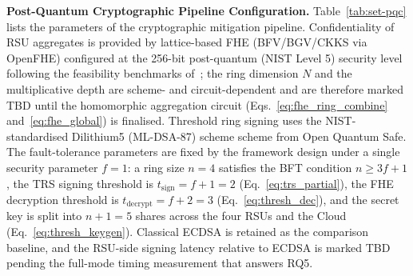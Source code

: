 \documentclass[12pt, a4paper]{report}
\begin{document}
\textbf{Post-Quantum Cryptographic Pipeline Configuration.}
Table~\ref{tab:set-pqc} lists the parameters of the cryptographic
mitigation pipeline. Confidentiality of RSU aggregates is provided by
lattice-based FHE (BFV/BGV/CKKS via OpenFHE) configured at the 256-bit post-quantum (NIST Level 5) security level following the feasibility benchmarks
of~\cite{mamun2025postquantum}; the ring dimension $N$ and the
multiplicative depth are scheme- and circuit-dependent and are therefore
marked TBD until the homomorphic aggregation circuit
(Eqs.~\eqref{eq:fhe_ring_combine} and~\eqref{eq:fhe_global}) is finalised.
Threshold ring signing uses the NIST-standardised Dilithium5 (ML-DSA-87) scheme
scheme from Open Quantum Safe. The fault-tolerance parameters are fixed by
the framework design under a single security parameter $f=1$: a ring size
$n=4$ satisfies the BFT condition $n \geq 3f+1$, the TRS signing threshold
is $t_{\mathrm{sign}}=f+1=2$ (Eq.~\eqref{eq:trs_partial}), the FHE
decryption threshold is $t_{\mathrm{decrypt}}=f+2=3$
(Eq.~\eqref{eq:thresh_dec}), and the secret key is split into $n+1=5$
shares across the four RSUs and the Cloud (Eq.~\eqref{eq:thresh_keygen}).
Classical ECDSA is retained as the comparison baseline, and the RSU-side
signing latency relative to ECDSA is marked TBD pending the full-mode
timing measurement that answers RQ5.
\end{document}
